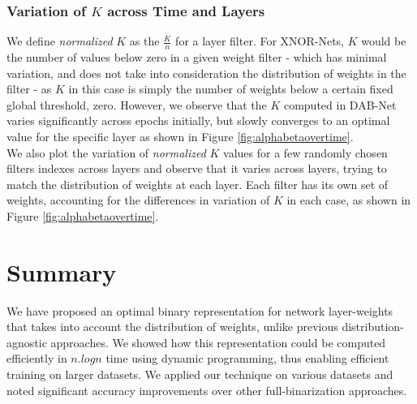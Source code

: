 \subsubsection{Variation of $K$ across Time and Layers}\label{sec:kacrosslayers}

\noindent We define \textit{normalized} $K$ as the $\frac{K}{n}$ for a layer filter. For XNOR-Nets, $K$ would be the number of values below zero in a given weight filter - which has minimal variation, and does not take into consideration the distribution of weights in the filter - as $K$ in this case is simply the number of weights below a certain fixed global threshold, zero. However, we observe that the $K$ computed in DAB-Net varies significantly across epochs initially, but slowly converges to an optimal value for the specific layer as shown in Figure \ref{fig:alphabetaovertime}.\\

\noindent We also plot the variation of \textit{normalized} $K$ values for a few randomly chosen filters indexes across layers and observe that it varies across layers, trying to match the distribution of weights at each layer. Each filter has its own set of weights, accounting for the differences in variation of $K$ in each case, as shown in Figure \ref{fig:alphabetaovertime}.

\section{Summary}

\noindent We have proposed an optimal binary representation for network layer-weights that takes into account the distribution of weights, unlike previous distribution-agnostic approaches. We showed how this representation could be computed efficiently in $n.logn$ time using dynamic programming, thus enabling efficient training on larger datasets. We applied our technique on various datasets and noted significant accuracy improvements over other full-binarization approaches. 